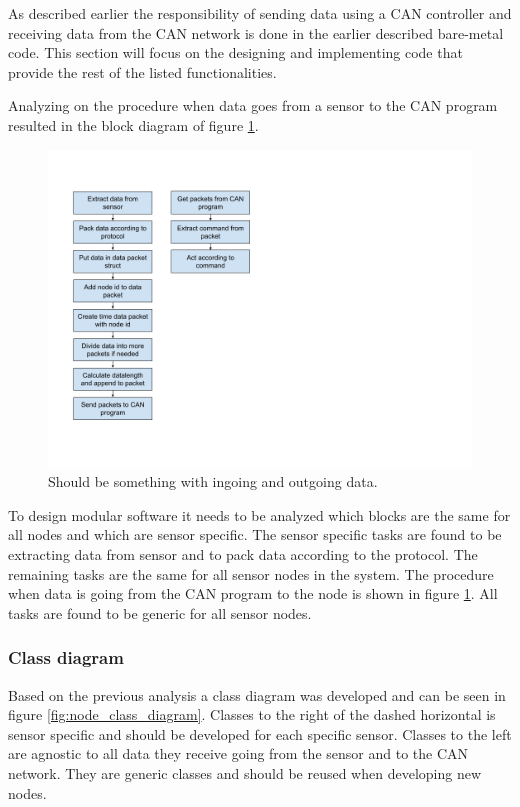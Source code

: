 As described earlier the responsibility of sending data using a CAN controller and receiving data from the CAN network is done in the earlier described bare-metal code.
This section will focus on the designing and implementing code that provide the rest of the listed functionalities.

Analyzing on the procedure when data goes from a sensor to the CAN program resulted in the block diagram of figure \ref{fig:block_gps}.

\begin{figure}[!h]
\centering
\includegraphics[width=1\textwidth]{graphics/block_diagram.png}
\caption{Should be something with ingoing and outgoing data.}
\label{fig:block_gps}
\end{figure}

To design modular software it needs to be analyzed which blocks are the same for all nodes and which are sensor specific.
The sensor specific tasks are found to be extracting data from sensor and to pack data according to the protocol.
The remaining tasks are the same for all sensor nodes in the system. 
The procedure when data is going from the CAN program to the node is shown in figure \ref{fig:block_gps}.
All tasks are found to be generic for all sensor nodes.

\subsubsection*{Class diagram}
Based on the previous analysis a class diagram was developed and can be seen in figure \ref{fig:node_class_diagram}.
Classes to the right of the dashed horizontal is sensor specific and should be developed for each specific sensor.
Classes to the left are agnostic to all data they receive going from the sensor and to the CAN network.
They are generic classes and should be reused when developing new nodes.

